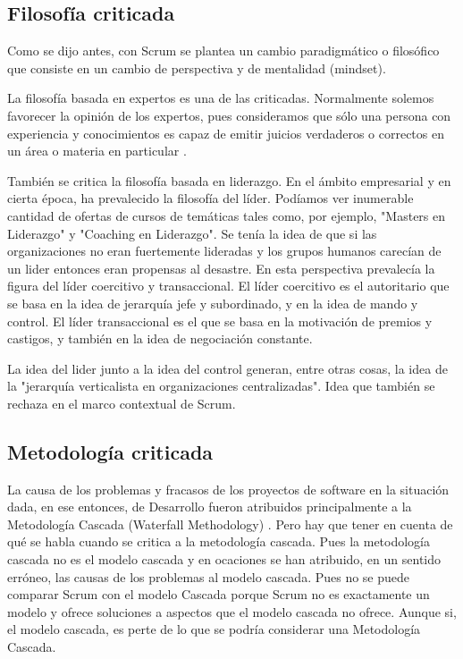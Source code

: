 \subsection{Filosofía criticada}

Como se dijo antes, con Scrum se plantea un cambio paradigmático o filosófico que consiste en un cambio de perspectiva y de mentalidad (mindset).

La filosofía basada en expertos es una de las criticadas. Normalmente solemos favorecer la opinión de los expertos, pues consideramos que sólo una persona con experiencia y conocimientos es capaz de emitir juicios verdaderos o correctos en un área o materia en particular \cite{James-Surowiecki-2005}.

También se critica la filosofía basada en liderazgo. En el ámbito empresarial y en cierta época, ha prevalecido la filosofía del líder. Podíamos ver inumerable cantidad de ofertas de cursos de temáticas tales como, por ejemplo, "Masters en Liderazgo" y "Coaching en Liderazgo". Se tenía la idea de que si las organizaciones no eran fuertemente lideradas y los grupos humanos carecían de un lider entonces eran propensas al desastre. En esta perspectiva prevalecía la figura del líder coercitivo y transaccional. El líder coercitivo es el autoritario que se basa en la idea de jerarquía jefe y subordinado, y en la idea de mando y control. El líder transaccional es el que se basa en la motivación de premios y castigos, y también en la idea de negociación constante.

La idea del lider junto a la idea del control generan, entre otras cosas, la idea de la "jerarquía verticalista en organizaciones centralizadas". Idea que también se rechaza en el marco contextual de Scrum.

\subsection{Metodología criticada}

La causa de los problemas y fracasos de los proyectos de software en la situación dada, en ese entonces, de Desarrollo fueron atribuidos principalmente a la Metodología Cascada (Waterfall Methodology) \cite{Ken-Schwaber-1995}. Pero hay que tener en cuenta de qué se habla cuando se critica a la metodología cascada. Pues la metodología cascada no es el modelo cascada y en ocaciones se han atribuido, en un sentido erróneo, las causas de los problemas al modelo cascada. Pues no se puede comparar Scrum con el modelo Cascada porque Scrum no es exactamente un modelo y ofrece soluciones a aspectos que el modelo cascada no ofrece. Aunque si, el modelo cascada, es perte de lo que se podría considerar una Metodología Cascada. 

